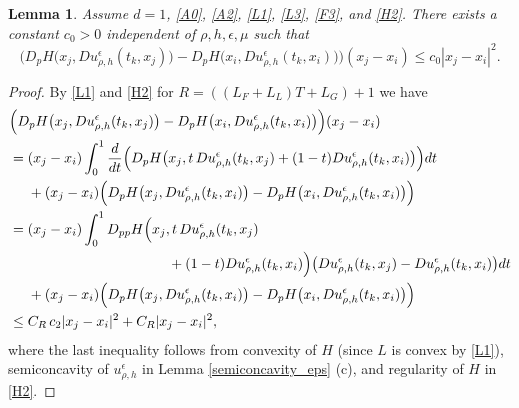 \documentclass[a4paper,  twoside, 10pt, leqno]{amsart}
\newtheorem{lemma}[thm]{Lemma}
\theoremstyle{remark}
\theoremstyle{definition}
\begin{document}
\begin{lemma} \label{lem:dimone-semicon}
Assume $d=1$, \ref{A0}, \ref{A2}, \ref{L1}, \ref{L3}, \ref{F3}, and \ref{H2}. There exists a constant $c_0>0$ independent of $\rho,h,\epsilon,\mu$ such that
 $$\Big(D_pH\big(x_j,Du^{\epsilon}_{\rho,h}(t_k,x_j)\big)- D_p H \big(x_i, Du^{\epsilon}_{\rho,h}(t_k,x_i)\big)\Big) (x_j-x_i) \leq c_0 |x_j-x_i|^2. $$
\end{lemma} 
\begin{proof}
By \ref{L1} and \ref{H2} for $R = (  ( L_{F} + L_{L} )T + L_G)  +1$ we have 
 \begin{align*}
&  \Big(D_pH\big(x_j,Du^{\epsilon}_{\rho,h}(t_k,x_j)\big)- D_p H \big(x_i, Du^{\epsilon}_{\rho,h}(t_k,x_i)\big)\Big) (x_j-x_i) \\
& = (x_j-x_i)\int_0^1 \frac{d}{dt} \Big( D_pH\big(x_j,t \, Du^{\epsilon}_{\rho,h}(t_k,x_j) + (1-t)Du^{\epsilon}_{\rho,h}(t_k,x_i)\big) \Big) dt  \\
& \quad \ + (x_j-x_i) \Big(D_pH\big(x_j,Du^{\epsilon}_{\rho,h}(t_k,x_i)\big)- D_p H \big(x_i, Du^{\epsilon}_{\rho,h}(t_k,x_i)\big)\Big) \\
&   =  (x_j-x_i)\int_0^1 D_{pp} H\Big(x_j,t \, Du^{\epsilon}_{\rho,h}(t_k,x_j)  \\ 
& \hspace*{4cm}  + (1-t)Du^{\epsilon}_{\rho,h}(t_k,x_i)\Big) \big(Du^{\epsilon}_{\rho,h}(t_k,x_j) - Du^{\epsilon}_{\rho,h}(t_k,x_i)\big)  dt \\
& \quad \ + (x_j-x_i) \Big(D_pH\big(x_j,Du^{\epsilon}_{\rho,h}(t_k,x_i)\big)- D_p H \big(x_i, Du^{\epsilon}_{\rho,h}(t_k,x_i)\big)\Big)  \\
& \leq C_R \, c_2 |x_j-x_i|^2 +C_R |x_j-x_i|^2,
 \end{align*}
 where the last inequality follows from convexity of $H$ (since $L$ is convex by \ref{L1}), semiconcavity of $u^{\epsilon}_{\rho,h}$ in Lemma \ref{semiconcavity_eps} (c), and regularity of $H$ in \ref{H2}.
\end{proof}
 
\end{document}
